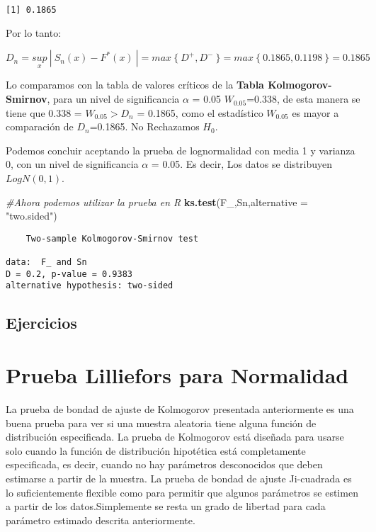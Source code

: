 \documentclass[
  a4paper,
  oneside,
  openany]{book}
\newenvironment{Shaded}{\begin{snugshade}}{\end{snugshade}}
\newcommand{\CommentTok}[1]{\textcolor[rgb]{0.56,0.35,0.01}{\textit{#1}}}
\newcommand{\DataTypeTok}[1]{\textcolor[rgb]{0.13,0.29,0.53}{#1}}
\newcommand{\KeywordTok}[1]{\textcolor[rgb]{0.13,0.29,0.53}{\textbf{#1}}}
\newcommand{\NormalTok}[1]{#1}
\newcommand{\StringTok}[1]{\textcolor[rgb]{0.31,0.60,0.02}{#1}}
\begin{document}
\begin{verbatim}
[1] 0.1865
\end{verbatim}

Por lo tanto:

\[D_{n}=\underset{x}{sup} \ | \ S_{n}(x)-F^*(x)\ |=max\ \{\ D^+,D^- \ \}=max \ \{ \ 0.1865,0.1198 \ \}=0.1865\]

Lo comparamos con la tabla de valores críticos de la \textbf{Tabla Kolmogorov-Smirnov}, para un nivel de significancia \(\alpha\) = 0.05
\(W_{0.05}\)=0.338, de esta manera se tiene que 0.338 = \(W_{0.05} > D_{n}\) = 0.1865, como el estadístico \(W_{0.05}\) es mayor a comparación de \(D_{n}\)=0.1865.
No Rechazamos \(H_0\).

Podemos concluir aceptando la prueba de lognormalidad con media 1 y varianza 0, con un nivel de significancia \(\alpha\) = 0.05. Es decir, Los datos se distribuyen \(LogN(0,1)\).

\begin{Shaded}
\begin{Highlighting}[]
\CommentTok{\#Ahora podemos utilizar la prueba en R}
\KeywordTok{ks.test}\NormalTok{(F\_,Sn,}\DataTypeTok{alternative =} \StringTok{"two.sided"}\NormalTok{)}
\end{Highlighting}
\end{Shaded}

\begin{verbatim}
    Two-sample Kolmogorov-Smirnov test

data:  F_ and Sn
D = 0.2, p-value = 0.9383
alternative hypothesis: two-sided
\end{verbatim}

\hypertarget{ejercicios-10}{%
\section{Ejercicios}\label{ejercicios-10}}

\hypertarget{prueba-lilliefors-para-normalidad}{%
\chapter{Prueba Lilliefors para Normalidad}\label{prueba-lilliefors-para-normalidad}}

La prueba de bondad de ajuste de Kolmogorov presentada anteriormente es una buena prueba para ver si una muestra aleatoria tiene alguna función de distribución especificada. La prueba de Kolmogorov está diseñada para usarse solo cuando la función de distribución hipotética está completamente especificada, es decir, cuando no hay parámetros desconocidos que deben estimarse a partir de la muestra.
La prueba de bondad de ajuste Ji-cuadrada es lo suficientemente flexible como para permitir que algunos parámetros se estimen a partir de los datos.Simplemente se resta un grado de libertad para cada parámetro estimado descrita anteriormente.
\end{document}
